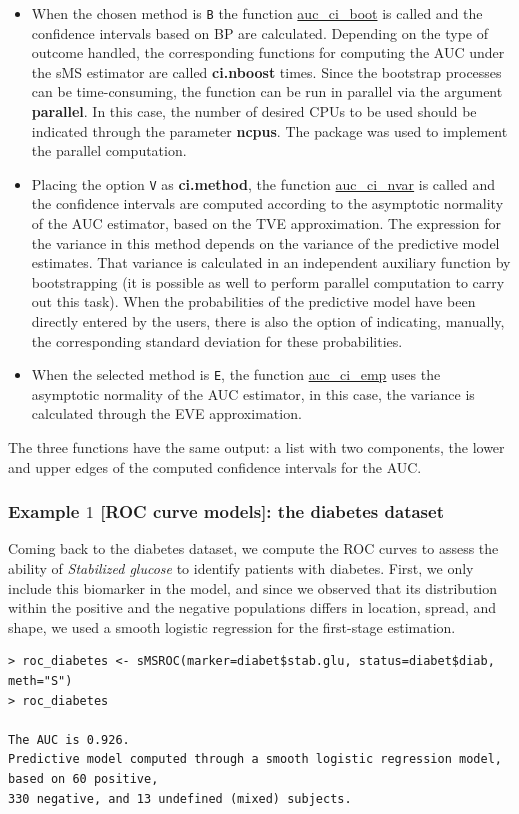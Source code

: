 \begin{itemize}
\item{When the chosen method is {\texttt {B}} the function \url{auc_ci_boot} is called and the confidence intervals based on BP are calculated. Depending on the type of outcome handled, the corresponding functions for computing the AUC under the sMS estimator are called {\bf ci.nboost} times. Since the bootstrap processes can be time-consuming, the function can be run in parallel via the argument {\textbf{parallel}}. In this case, the number of desired CPUs to be used should be indicated through the parameter {\textbf{ncpus}}. The package  was used to implement the parallel computation.}
\item{Placing the option {\texttt {V}} as {\bf ci.method}, the function \url{auc_ci_nvar} is called and the confidence intervals are computed according to the asymptotic normality of the AUC estimator, based on the TVE approximation. The expression for the variance in this method depends on the variance of the predictive model estimates. That variance is calculated in an independent auxiliary function by bootstrapping (it is possible as well to perform parallel computation to carry out this task). When the probabilities of the predictive model have been directly entered by the users, there is also the option of indicating, manually, the corresponding standard deviation for these probabilities.}
\item{When the selected method is {\texttt{E}}, the function \url{auc_ci_emp} uses the asymptotic normality of the AUC estimator, in this case, the variance is calculated through the EVE approximation.}
\end{itemize}
The three functions have the same output: a list with two components, the lower and upper edges of the computed confidence intervals for the AUC.

\subsubsection{Example $1$ [ROC curve models]: the diabetes dataset}
Coming back to the diabetes dataset, we compute the ROC curves to assess the ability of {\textit{Stabilized glucose}} to identify patients with diabetes.  First, we only include this biomarker in the model, and since we observed that its distribution within the positive and the negative populations differs in location, spread, and shape, we used a smooth logistic regression for the first-stage estimation.
\begin{verbatim}
> roc_diabetes <- sMSROC(marker=diabet$stab.glu, status=diabet$diab,  meth="S")
> roc_diabetes

The AUC is 0.926. 
Predictive model computed through a smooth logistic regression model, based on 60 positive, 
330 negative, and 13 undefined (mixed) subjects.
\end{verbatim}

